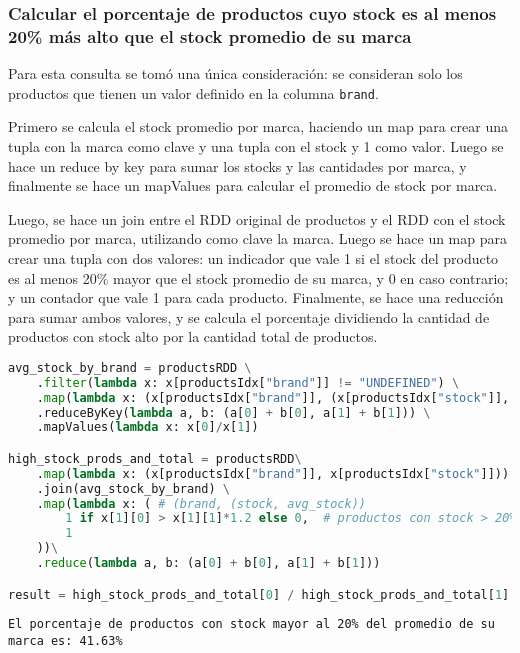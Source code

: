 \subsubsection{Calcular el porcentaje de productos cuyo stock es al menos 20\% más alto que el stock promedio de su marca}

Para esta consulta se tomó una única consideración: se consideran solo los productos que tienen un valor definido en la columna \texttt{brand}.

Primero se calcula el stock promedio por marca, haciendo un map para crear una tupla con la marca como clave y una tupla con el stock y 1 como valor. Luego se hace un reduce by key para sumar los stocks y las cantidades por marca, y finalmente se hace un mapValues para calcular el promedio de stock por marca.

Luego, se hace un join entre el RDD original de productos y el RDD con el stock promedio por marca, utilizando como clave la marca. Luego se hace un map para crear una tupla con dos valores: un indicador que vale 1 si el stock del producto es al menos 20\% mayor que el stock promedio de su marca, y 0 en caso contrario; y un contador que vale 1 para cada producto. Finalmente, se hace una reducción para sumar ambos valores, y se calcula el porcentaje dividiendo la cantidad de productos con stock alto por la cantidad total de productos.

\begin{lstlisting}[language=Python, caption=Resolución de la consulta 5 propuesta por el enunciado, label={lst:enunciado_q5}, xleftmargin=20pt, xrightmargin=20pt]
avg_stock_by_brand = productsRDD \
    .filter(lambda x: x[productsIdx["brand"]] != "UNDEFINED") \
    .map(lambda x: (x[productsIdx["brand"]], (x[productsIdx["stock"]], 1))) \
    .reduceByKey(lambda a, b: (a[0] + b[0], a[1] + b[1])) \
    .mapValues(lambda x: x[0]/x[1])

high_stock_prods_and_total = productsRDD\
    .map(lambda x: (x[productsIdx["brand"]], x[productsIdx["stock"]])) \
    .join(avg_stock_by_brand) \
    .map(lambda x: ( # (brand, (stock, avg_stock))
        1 if x[1][0] > x[1][1]*1.2 else 0,  # productos con stock > 20% del promedio
        1
    ))\
    .reduce(lambda a, b: (a[0] + b[0], a[1] + b[1]))

result = high_stock_prods_and_total[0] / high_stock_prods_and_total[1] * 100
\end{lstlisting}

\begin{lstlisting}[style=console, caption=Resultados de la consulta 5 propuesta por el enunciado, label={lst:enunciado_q5_results}, xleftmargin=10pt, xrightmargin=10pts]
El porcentaje de productos con stock mayor al 20% del promedio de su marca es: 41.63%
\end{lstlisting}

